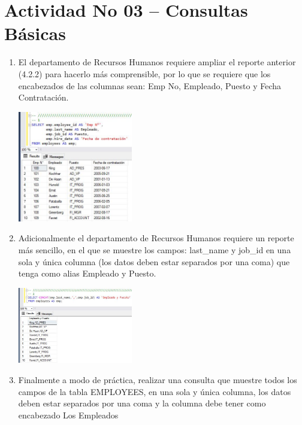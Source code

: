 \section{Actividad No 03 – Consultas B\'asicas} 
		
\begin{enumerate}[1.]
	\item El departamento de Recursos Humanos requiere ampliar el reporte anterior (4.2.2) para hacerlo m\'as comprensible, por lo que se requiere que los encabezados de las columnas sean: Emp No, Empleado, Puesto y Fecha Contrataci\'on.

\begin{itemize}
	\begin{center}
	\includegraphics[width=5cm]{./Imagenes/actividad0301} 
	\end{center}
\end{itemize}

	\item Adicionalmente el departamento de Recursos Humanos requiere un reporte más sencillo, en el que se muestre los campos: last\_name y job\_id en una sola y \'unica columna (los datos deben estar separados por una coma) que tenga como alias Empleado y Puesto.

\begin{itemize}
	\begin{center}
	\includegraphics[width=5cm]{./Imagenes/actividad0302} 
	\end{center}
\end{itemize}

	\item Finalmente a modo de práctica, realizar una consulta que muestre todos los campos de la tabla EMPLOYEES, en una sola y única columna, los datos deben estar separados por una coma y la columna debe tener como encabezado Los Empleados
\end{enumerate}

